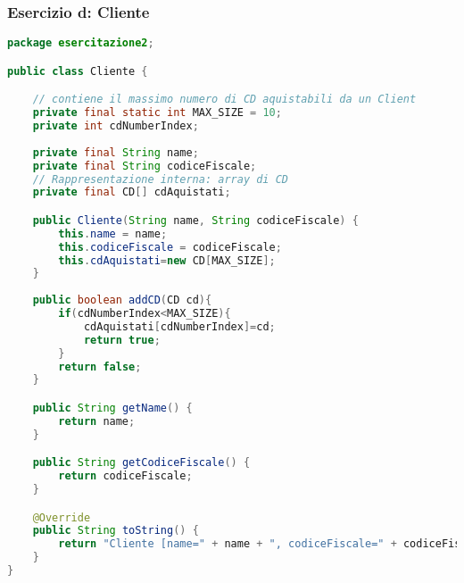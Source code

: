 \documentclass{article}
\begin{document}
\subsubsection{Esercizio d: Cliente}
\begin{lstlisting}[language=Java,escapechar=|]
package esercitazione2;

public class Cliente {

	// contiene il massimo numero di CD aquistabili da un Client
	private final static int MAX_SIZE = 10;
	private int cdNumberIndex;
	
	private final String name;
	private final String codiceFiscale;
	// Rappresentazione interna: array di CD
	private final CD[] cdAquistati;

	public Cliente(String name, String codiceFiscale) {
		this.name = name;
		this.codiceFiscale = codiceFiscale;
		this.cdAquistati=new CD[MAX_SIZE];
	}
	
	public boolean addCD(CD cd){
		if(cdNumberIndex<MAX_SIZE){
			cdAquistati[cdNumberIndex]=cd;
			return true;
		}
		return false;
	}

	public String getName() {
		return name;
	}

	public String getCodiceFiscale() {
		return codiceFiscale;
	}

	@Override
	public String toString() {
		return "Cliente [name=" + name + ", codiceFiscale=" + codiceFiscale+ "]";
	}
}
\end{lstlisting}
\end{document}

